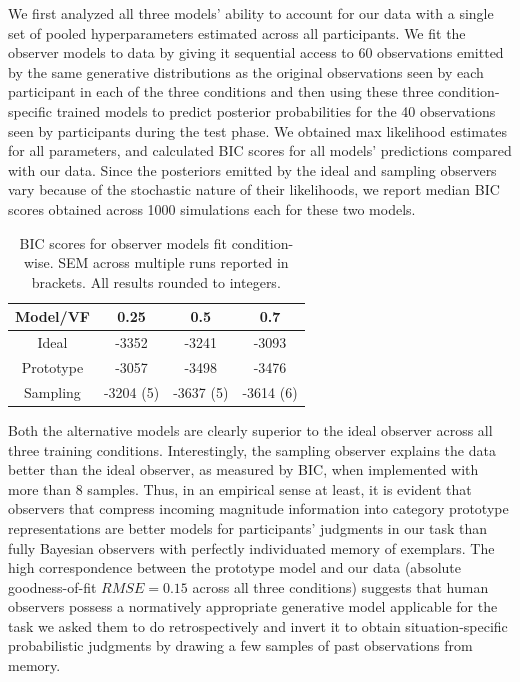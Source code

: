 \documentclass[10pt,letterpaper]{article}
\begin{document}
We first analyzed all three models' ability to account for our data with a single set of pooled hyperparameters estimated across all participants. We fit the observer models to data by giving it sequential access to 60 observations emitted by the same generative distributions as the original observations seen by each participant in each of the three conditions and then using these three condition-specific trained models to predict posterior probabilities for the 40 observations seen by participants during the test phase. We obtained max likelihood estimates for all parameters, and calculated BIC scores for all models' predictions compared with our data. Since the posteriors emitted by the ideal and sampling observers vary because of the stochastic nature of their likelihoods, we report median BIC scores obtained across 1000 simulations each for these two models. 

\begin{table}[]
    \centering
    \begin{tabular}{|c|c|c|c|}
    \hline
         Model/VF & 0.25 & 0.5 & 0.7 \\
         \hline
         Ideal & -3352 & -3241 & -3093 \\
         Prototype & -3057 & -3498 & -3476 \\
         Sampling & -3204 (5) & -3637 (5) & -3614 (6) \\
         \hline 
    \end{tabular}
    \caption{BIC scores for observer models fit condition-wise. SEM across multiple runs reported in brackets. All results rounded to integers.}
    \label{tab:bic}
\end{table}

Both the alternative models are clearly superior to the ideal observer across all three training conditions. Interestingly, the sampling observer explains the data better than the ideal observer, as measured by BIC, when implemented with more than 8 samples. Thus, in an empirical sense at least, it is evident that observers that compress incoming magnitude information into category prototype representations are better models for participants' judgments in our task than fully Bayesian observers with perfectly individuated memory of exemplars. The high correspondence between the prototype model and our data (absolute goodness-of-fit $RMSE=0.15$ across all three conditions) suggests that human observers possess a normatively appropriate generative model applicable for the task we asked them to do retrospectively and invert it to obtain situation-specific probabilistic judgments by drawing a few samples of past observations from memory.  
\end{document}
